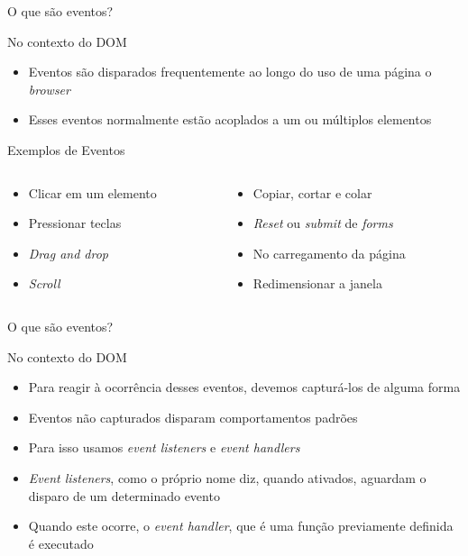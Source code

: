 \begin{frame}{O que são eventos?}
  \begin{block}{No contexto do DOM}
    \begin{itemize}
      \item Eventos são disparados frequentemente ao longo do uso de uma página
            o \textit{browser}
      \item Esses eventos normalmente estão acoplados a um ou múltiplos
            elementos
    \end{itemize}
  \end{block}
  \begin{exampleblock}{Exemplos de Eventos}
    \begin{columns}
      \begin{column}{0.45\textwidth}
        \begin{itemize}
          \item Clicar em um elemento
          \item Pressionar teclas
          \item \textit{Drag and drop}
          \item \textit{Scroll}
        \end{itemize}
      \end{column}
      \begin{column}{0.5\textwidth}
        \begin{itemize}
          \item Copiar, cortar e colar
          \item \textit{Reset} ou \textit{submit} de \textit{forms}
          \item No carregamento da página
          \item Redimensionar a janela
        \end{itemize}
      \end{column}
    \end{columns}
  \end{exampleblock}
\end{frame}

\begin{frame}{O que são eventos?}
  \begin{block}{No contexto do DOM}
    \begin{itemize}
      \item Para reagir à ocorrência desses eventos, devemos capturá-los de
            alguma forma
      \item Eventos não capturados disparam comportamentos padrões
      \item Para isso usamos \textit{event listeners} e \textit{event handlers}
      \item \textit{Event listeners}, como o próprio nome diz, quando ativados,
            aguardam o disparo de um determinado evento
      \item Quando este ocorre, o \textit{event handler}, que é uma função
            previamente definida é executado
    \end{itemize}
  \end{block}
\end{frame}

